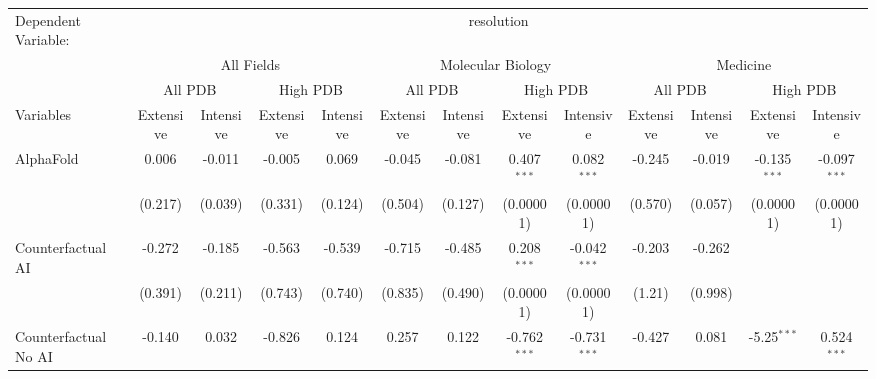 \begingroup
\centering
\begin{tabular}{lcccccccccccc}
   \tabularnewline \midrule \midrule
   Dependent Variable: & \multicolumn{12}{c}{resolution}\\
 & \multicolumn{4}{c}{All Fields} & \multicolumn{4}{c}{Molecular Biology} & \multicolumn{4}{c}{Medicine} \\
\cmidrule(lr){2-5} \cmidrule(lr){6-9} \cmidrule(lr){10-13}
 & \multicolumn{2}{c}{All PDB} & \multicolumn{2}{c}{High PDB} & \multicolumn{2}{c}{All PDB} & \multicolumn{2}{c}{High PDB} & \multicolumn{2}{c}{All PDB} & \multicolumn{2}{c}{High PDB} \\
\cmidrule(lr){2-3} \cmidrule(lr){4-5} \cmidrule(lr){6-7} \cmidrule(lr){8-9} \cmidrule(lr){10-11} \cmidrule(lr){12-13}
Variables & \multicolumn{1}{c}{Extensive} & \multicolumn{1}{c}{Intensive} & \multicolumn{1}{c}{Extensive} & \multicolumn{1}{c}{Intensive} & \multicolumn{1}{c}{Extensive} & \multicolumn{1}{c}{Intensive} & \multicolumn{1}{c}{Extensive} & \multicolumn{1}{c}{Intensive} & \multicolumn{1}{c}{Extensive} & \multicolumn{1}{c}{Intensive} & \multicolumn{1}{c}{Extensive} & \multicolumn{1}{c}{Intensive} \\
\cmidrule(lr){1-1}\cmidrule(lr){2-2} \cmidrule(lr){3-3} \cmidrule(lr){4-4} \cmidrule(lr){5-5} \cmidrule(lr){6-6} \cmidrule(lr){7-7} \cmidrule(lr){8-8} \cmidrule(lr){9-9} \cmidrule(lr){10-10} \cmidrule(lr){11-11} \cmidrule(lr){12-12} \cmidrule(lr){13-13}
   AlphaFold                                & 0.006   & -0.011  & -0.005  & 0.069   & -0.045  & -0.081  & 0.407$^{***}$  & 0.082$^{***}$  & -0.245  & -0.019  & -0.135$^{***}$ & -0.097$^{***}$\\   
                                            & (0.217) & (0.039) & (0.331) & (0.124) & (0.504) & (0.127) & (0.00001)      & (0.00001)      & (0.570) & (0.057) & (0.00001)      & (0.00001)\\   
   Counterfactual AI                        & -0.272  & -0.185  & -0.563  & -0.539  & -0.715  & -0.485  & 0.208$^{***}$  & -0.042$^{***}$ & -0.203  & -0.262  &                &   \\   
                                            & (0.391) & (0.211) & (0.743) & (0.740) & (0.835) & (0.490) & (0.00001)      & (0.00001)      & (1.21)  & (0.998) &                &   \\   
   Counterfactual No AI                     & -0.140  & 0.032   & -0.826  & 0.124   & 0.257   & 0.122   & -0.762$^{***}$ & -0.731$^{***}$ & -0.427  & 0.081   & -5.25$^{***}$  & 0.524$^{***}$\\   

\end{tabular}

